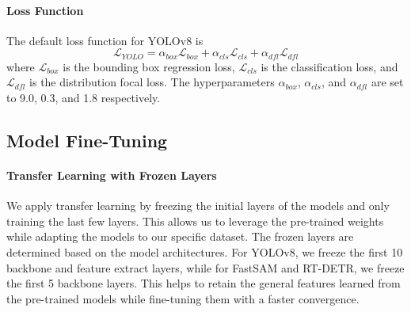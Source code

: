 \documentclass{article}
\begin{document}
\paragraph{Loss Function} The default loss function for YOLOv8 is
$$
\mathcal{L}_{YOLO} = \alpha_{box}\mathcal{L}_{box} + \alpha_{cls}\mathcal{L}_{cls} + \alpha_{dfl}\mathcal{L}_{dfl} 
$$
where $\mathcal{L}_{box}$ is the bounding box regression loss, $\mathcal{L}_{cls}$ is the classification loss, and $\mathcal{L}_{dfl}$ is the distribution focal loss. The hyperparameters $\alpha_{box}$, $\alpha_{cls}$, and $\alpha_{dfl}$ are set to 9.0, 0.3, and 1.8 respectively.

\subsection{Model Fine-Tuning}

\paragraph{Transfer Learning with Frozen Layers} We apply transfer learning by freezing the initial layers of the models and only training the last few layers. This allows us to leverage the pre-trained weights while adapting the models to our specific dataset. The frozen layers are determined based on the model architectures. For YOLOv8, we freeze the first 10 backbone and feature extract layers, while for FastSAM and RT-DETR, we freeze the first 5 backbone layers. This helps to retain the general features learned from the pre-trained models while fine-tuning them with a faster convergence.
\end{document}
